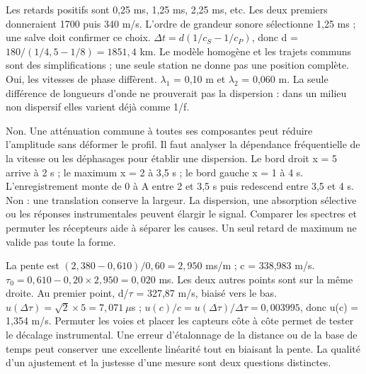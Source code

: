 Les retards positifs sont 0,25 ms, 1,25 ms, 2,25 ms, etc. Les deux premiers donneraient 1700 puis 340 m/s. L’ordre de grandeur sonore sélectionne 1,25 ms ; une salve doit confirmer ce choix.
$\Delta t=d(1/c_S-1/c_P)$, donc d = $180/(1/4{,}5-1/8)=1851{,}4$ km. Le modèle homogène et les trajets communs sont des simplifications ; une seule station ne donne pas une position complète.
Oui, les vitesses de phase diffèrent. \ensuremath{\lambda_1} = 0,10 m et \ensuremath{\lambda_2} = 0,060 m. La seule différence de longueurs d’onde ne prouverait pas la dispersion : dans un milieu non dispersif elles varient déjà comme 1/f.


Non. Une atténuation commune à toutes ses composantes peut réduire l’amplitude sans déformer le profil. Il faut analyser la dépendance fréquentielle de la vitesse ou les déphasages pour établir une dispersion.
Le bord droit x = 5 arrive à 2 s ; le maximum x = 2 à 3,5 s ; le bord gauche x = 1 à 4 s. L’enregistrement monte de 0 à A entre 2 et 3,5 s puis redescend entre 3,5 et 4 s.
Non : une translation conserve la largeur. La dispersion, une absorption sélective ou les réponses instrumentales peuvent élargir le signal. Comparer les spectres et permuter les récepteurs aide à séparer les causes. Un seul retard de maximum ne valide pas toute la forme.


La pente est $(2{,}380-0{,}610)/0{,}60=2{,}950$ ms/m ; c = 338,983 m/s. $\tau_0=0{,}610-0{,}20\times2{,}950=0{,}020$ ms. Les deux autres points sont sur la même droite. Au premier point, d/\ensuremath{\tau} = 327,87 m/s, biaisé vers le bas. $u(\Delta\tau)=\sqrt2\times5=7{,}071\ \mu$s ; $u(c)/c=u(\Delta\tau)/\Delta\tau=0{,}003995$, donc u(c) = 1,354 m/s. Permuter les voies et placer les capteurs côte à côte permet de tester le décalage instrumental. Une erreur d’étalonnage de la distance ou de la base de temps peut conserver une excellente linéarité tout en biaisant la pente. La qualité d’un ajustement et la justesse d’une mesure sont deux questions distinctes.

